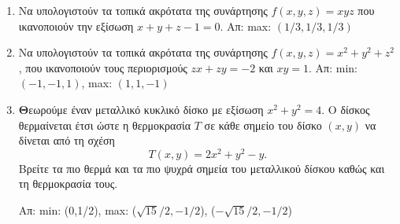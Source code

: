 \documentclass[a4paper,table]{report}
\begin{document}
\begin{enumerate}
  \item Να υπολογιστούν τα τοπικά ακρότατα της συνάρτησης 
    $f(x,y,z)=xyz$ που ικανοποιούν την εξίσωση $x+y+z-1=0$.  
    \hfill Απ: max: $ (1/3,1/3,1/3) $ 

  \item Να υπολογιστούν τα τοπικά ακρότατα της συνάρτησης 
    $ f(x,y,z) = x^{2}+y^{2}+z^{2} $, που ικανοποιούν τους περιορισμούς 
    $ zx+zy=-2 $ και $ xy=1 $.
    \hfill Απ: min: $ (-1,-1,1) $, max: $ (1,1,-1) $ 

  \item \textbf Θεωρούμε έναν μεταλλικό κυκλικό δίσκο με εξίσωση 
    $ x^{2}+y^{2}=4 $. Ο δίσκος θερμαίνεται έτσι ώστε η θερμοκρασία $ T $ σε κάθε 
    σημείο του δίσκο $ (x,y) $ να δίνεται από τη σχέση
    \[
      T(x,y) = 2x^{2}+y^{2}-y.
    \] 
    Βρείτε τα πιο θερμά και τα πιο ψυχρά σημεία του μεταλλικού δίσκου καθώς και τη
    θερμοκρασία τους.

    \hfill Απ: min: (0,1/2), max: ($ \sqrt{15}/{2} , -1/2 $), ($ -\sqrt{15}/{2} , -1/2 $)
\end{enumerate}
\end{document}
